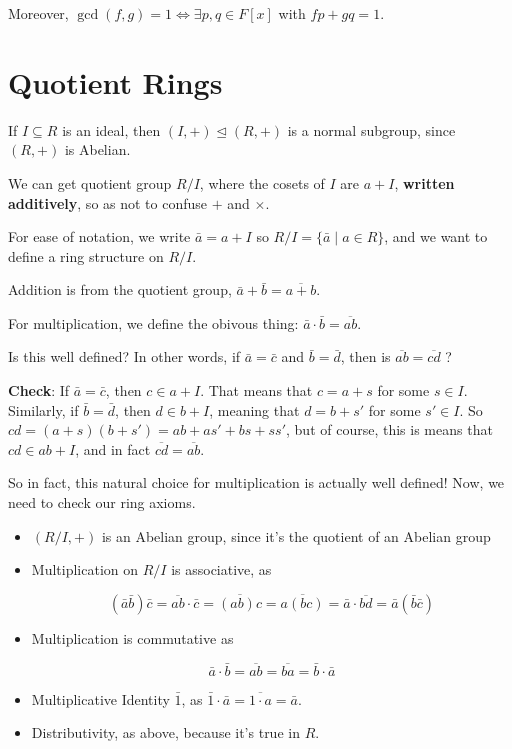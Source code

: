 \documentclass[12pt]{article}
\theoremstyle{remark}
\theoremstyle{remark}
\theoremstyle{remark}
\theoremstyle{remark}
\theoremstyle{remark}
\begin{document}
Moreover, $\gcd(f, g) = 1 \Leftrightarrow \exists p, q \in F[x]$ with $fp + gq =
1$.

\section{Quotient Rings}

If $I \subseteq R$ is an ideal, then $(I, +) \trianglelefteq (R, +)$ is a normal
subgroup, since $(R, +)$ is Abelian.

We can get quotient group $R / I$, where the cosets of $I$ are $a + I$, {\bf written
additively}, so as not to confuse $+$ and $\times$.

For ease of notation, we write $\bar a = a + I$ so $R / I = \{\bar a \mid a \in
R\}$, and we want to define a ring structure on $R / I$.

Addition is from the quotient group, $\bar a + \bar b = \overline{a + b}$.

For multiplication, we define the obivous thing: $\bar a \cdot \bar b =
\overline{ab}$. 

Is this well defined? In other words, if $\bar a = \bar c$ and $\bar b = \bar
d$, then is $\overline{ab} = \overline{cd}$ ?

{\bf Check}: If $\bar a = \bar c$, then $c \in a + I$. That means that $c = a +
s$ for some $s \in I$. Similarly, if $\bar b = \bar d$, then $d \in b + I$,
meaning that $d = b + s'$ for some $s' \in I$. So $cd = (a + s)(b + s') = ab +
as' + bs + ss'$, but of course, this is means that $cd \in ab + I$, and in fact
$\overline{cd} = \overline{ab}$.

So in fact, this natural choice for multiplication is actually well defined!
Now, we need to check our ring axioms.

\begin{itemize}
  \item $(R / I, +)$ is an Abelian group, since it's the quotient of an Abelian
    group
  \item Multiplication on $R / I$ is associative, as

    \[
      (\bar a \bar b) \bar c = \overline{ab} \cdot \bar c = \overline{(ab)c} = \overline{a(bc)} = \bar a \cdot \overline{bd} = \bar a (\bar b \bar c)
    \]

  \item Multiplication is commutative as

    \[
      \bar a \cdot \bar b = \overline{ab} = \overline{ba} = \bar b \cdot \bar a
    \]

  \item Multiplicative Identity $\bar 1$, as $\bar 1 \cdot \bar a = \overline{1
    \cdot a} = \bar a$.

  \item Distributivity, as above, because it's true in $R$.
\end{itemize}
\end{document}
